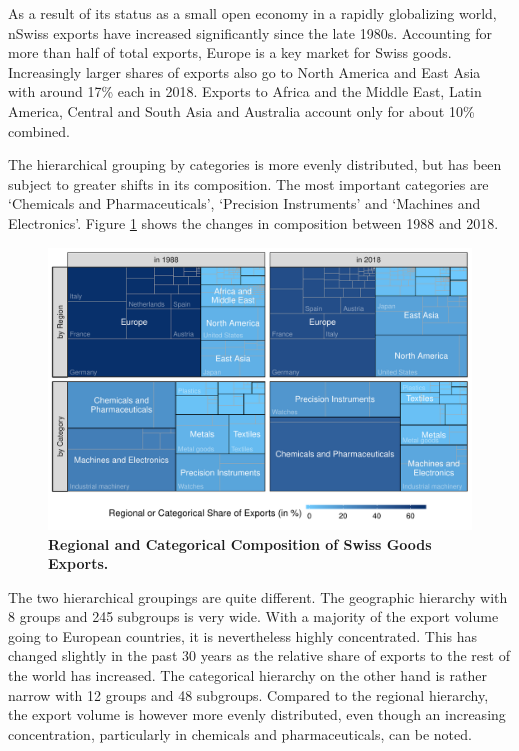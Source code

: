 \documentclass[a4paper,fleqn,11pt]{article}
\begin{document}
As a result of its status as a small open economy in a rapidly globalizing world, nSwiss exports have increased significantly since the late 1980s. Accounting for more than half of total exports, Europe is a key market for Swiss goods. Increasingly larger shares of exports also go to North America and East Asia with around 17\% each in 2018. Exports to Africa and the Middle East, Latin America, Central and South Asia and Australia account only for about 10\% combined.

The hierarchical grouping by categories is more evenly distributed, but has been subject to greater shifts in its composition. The most important categories are `Chemicals and Pharmaceuticals', `Precision Instruments' and `Machines and Electronics'. Figure \ref{fig:treemap} shows the changes in composition between 1988 and 2018.
\begin{figure}[H]
	\includegraphics[width=\textwidth]{fig/fig_treemap}
	\caption[Regional and Categorical Composition of Swiss Goods Exports]{\small{\textbf{Regional and Categorical Composition of Swiss Goods Exports.}}}\label{fig:treemap}
\end{figure}
The two hierarchical groupings are quite different. The geographic hierarchy with 8 groups and 245 subgroups is very wide. With a majority of the export volume going to European countries, it is nevertheless highly concentrated. This has changed slightly in the past 30 years as the relative share of exports to the rest of the world has increased. The categorical hierarchy on the other hand is rather narrow with 12 groups and 48 subgroups. Compared to the regional hierarchy, the export volume is however more evenly distributed, even though an increasing concentration, particularly in chemicals and pharmaceuticals, can be noted.\\
\end{document}
